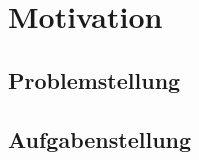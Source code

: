 \chapter{Motivation}
\label{chp:einleitung}



\section{Problemstellung}
\label{sec:problem}



\section{Aufgabenstellung}
\label{sec:aufgabe}
